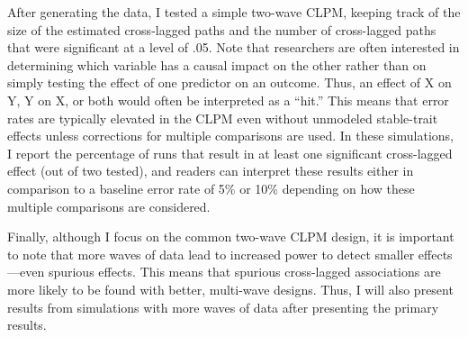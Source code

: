 \documentclass[
  english,
  man,floatsintext]{apa6}
\begin{document}
After generating the data, I tested a simple two-wave CLPM, keeping track of the size of the estimated cross-lagged paths and the number of cross-lagged paths that were significant at a level of .05. Note that researchers are often interested in determining which variable has a causal impact on the other rather than on simply testing the effect of one predictor on an outcome. Thus, an effect of X on Y, Y on X, or both would often be interpreted as a ``hit.'' This means that error rates are typically elevated in the CLPM even without unmodeled stable-trait effects unless corrections for multiple comparisons are used. In these simulations, I report the percentage of runs that result in at least one significant cross-lagged effect (out of two tested), and readers can interpret these results either in comparison to a baseline error rate of 5\% or 10\% depending on how these multiple comparisons are considered.

Finally, although I focus on the common two-wave CLPM design, it is important to note that more waves of data lead to increased power to detect smaller effects---even spurious effects. This means that spurious cross-lagged associations are more likely to be found with better, multi-wave designs. Thus, I will also present results from simulations with more waves of data after presenting the primary results.
\end{document}
